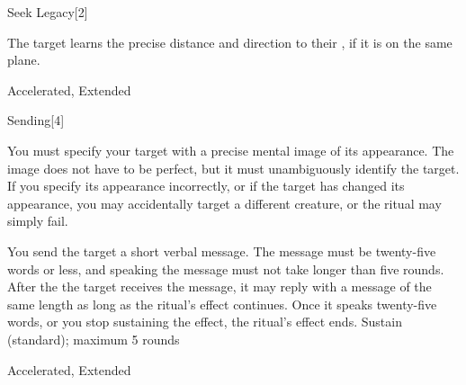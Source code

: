 \begin{spellsection}{Seek Legacy}[2]
\begin{spellcontent}
\begin{spelltargetinginfo}
\end{spelltargetinginfo}
\begin{spelleffects}
\spelleffect
The target learns the precise distance and direction to their , if it is on the same plane.
\end{spelleffects}
\end{spellcontent}
\begin{spellfooter}
 Accelerated, Extended
\end{spellfooter}
\begin{spellsubcontent}
\end{spellsubcontent}
\end{spellsection}
\begin{spellsection}{Sending}[4]
\begin{spellcontent}
\begin{spelltargetinginfo}
\spellspecial
You must specify your target with a precise mental image of its appearance.
The image does not have to be perfect, but it must unambiguously identify the target.
If you specify its appearance incorrectly, or if the target has changed its appearance, you may accidentally target a different creature, or the ritual may simply fail.
\end{spelltargetinginfo}
\begin{spelleffects}
\spelleffect
You send the target a short verbal message.
The message must be twenty-five words or less, and speaking the message must not take longer than five rounds.
After the the target receives the message, it may reply with a message of the same length as long as the ritual's effect continues.
Once it speaks twenty-five words, or you stop sustaining the effect, the ritual's effect ends.
\spelldur Sustain (standard); maximum 5 rounds
\end{spelleffects}
\end{spellcontent}
\begin{spellfooter}
 Accelerated, Extended
\end{spellfooter}
\begin{spellsubcontent}
\end{spellsubcontent}
\end{spellsection}
